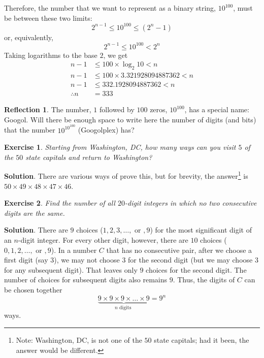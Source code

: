 \documentclass[11pt]{book}
\theoremstyle{definition}
\theoremstyle{plain}
\newtheorem{exercise}{Exercise}
\theoremstyle{definition}
\theoremstyle{problemstyle}
\theoremstyle{remark}
\theoremstyle{definition}
\newtheorem{reflection}{Reflection}
\begin{document}
Therefore, the number that we want to represent as a binary string, $10^{100}$, must be between these two limits:
\[
    2^{n-1}\leq10^{100}\leq(2^n-1)
\]
or, equivalently,
\[
    2^{n-1}\leq10^{100}<2^n
\]
Taking logarithms to the base $2$, we get
\begin{align*}
    n-1&\leq100\times\log_2{10}<n\\
    n-1&\leq100\times3.321928094887362<n\\
    n-1&\leq332.1928094887362<n\\
    \therefore n&=333
\end{align*}
\begin{reflection}
    The number, $1$ followed by $100$ zeros, $10^{100}$, has a special name: Googol. 
    Will there be enough space to write here the number of digits (and bits) that the number $10^{10^{100}}$ (Googolplex) has?
\end{reflection}
\begin{exercise}
    \label{ex:1.8.25}
    Starting from Washington, DC, how many ways can you visit $5$ of the $50$ state capitals and return to Washington?
\end{exercise}
\textbf{Solution}.
There are various ways of prove this, but for brevity, the answer\footnote{Note: Washington, DC, is not one of the $50$ state capitals; had it been, the answer would be different.} is $50\times49\times48\times47\times46$.
\begin{exercise}
    \label{ex:1.8.26}
    Find the number of all $\mathit{20}$-digit integers in which no two consecutive digits are the same.
\end{exercise}
\textbf{Solution}.
There are $9$ choices ($1,2,3,\dots,\text{ or },9$) for the most significant digit of an $n$-digit integer. For every other digit, however, there are $10$ choices ($0,1,2,\dots,\text{ or },9$). In a number $C$ that has no consecutive pair, after we choose a first digit (say $3$), we may not choose $3$ for the second digit (but we may choose $3$ for any subsequent digit). That leaves only $9$ choices for the second digit. The number of choices for subsequent digits also remains $9$. Thus, the digits of $C$ can be chosen together
\[
    \underbrace{9\times9\times9\times\dots\times9}_{n\text{ digits }}=9^n
\]
ways.
\end{document}

